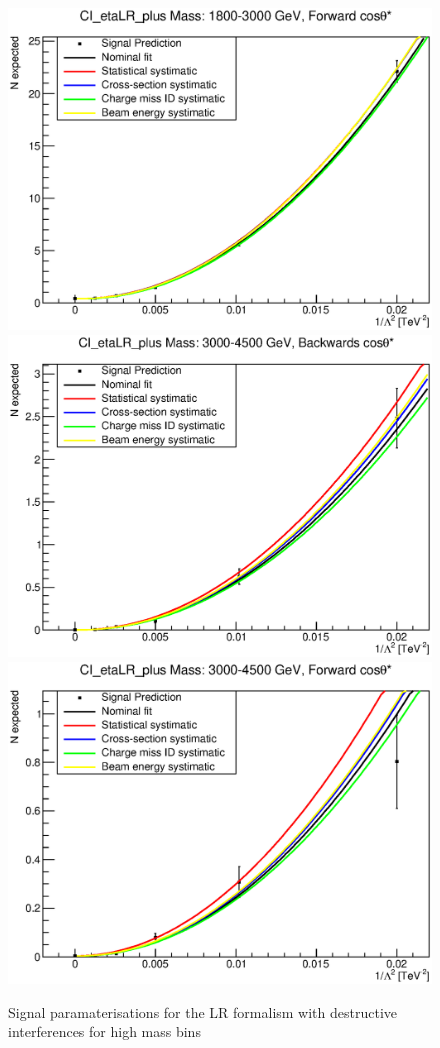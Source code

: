 \begin{figure}[ht]
			\includegraphics[width=0.49\linewidth]{images/thesis_fits/CI_2D_etaLR_plus_Mass_1800-3000_GeV_CTS_0_1.eps}
			\includegraphics[width=0.49\linewidth]{images/thesis_fits/CI_2D_etaLR_plus_Mass_3000-4500_GeV_CTS_-1_0.eps}
			\includegraphics[width=0.49\linewidth]{images/thesis_fits/CI_2D_etaLR_plus_Mass_3000-4500_GeV_CTS_0_1.eps}
		\caption{Signal paramaterisations for the LR formalism with destructive interferences for high mass bins}
		\label{fig:parm_LR_p_2}
	\end{figure}




